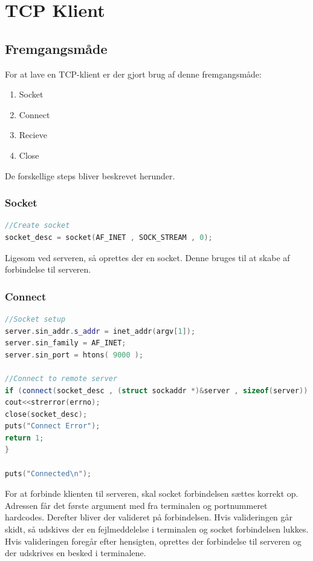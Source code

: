 \documentclass[12pt,fleqn,a4paper]{report}
\begin{document}
\chapter{TCP Klient}

\section{Fremgangsmåde}
For at lave en TCP-klient er der gjort brug af denne fremgangsmåde:
\begin{enumerate}
	\item Socket
	\item Connect
	\item Recieve
	\item Close
\end{enumerate}
De forskellige steps bliver beskrevet herunder.

\subsection{Socket}
\begin{framed}
	\begin{lstlisting}[language=C++]
//Create socket
socket_desc = socket(AF_INET , SOCK_STREAM , 0);
	\end{lstlisting}
\end{framed}

Ligesom ved serveren, så oprettes der en socket. Denne bruges til at skabe af forbindelse til serveren. 

\subsection{Connect}
\begin{framed}
\begin{lstlisting}[language=C++]
//Socket setup
server.sin_addr.s_addr = inet_addr(argv[1]);
server.sin_family = AF_INET;
server.sin_port = htons( 9000 );
	
//Connect to remote server
if (connect(socket_desc , (struct sockaddr *)&server , sizeof(server)) < 0) {
cout<<strerror(errno);
close(socket_desc);
puts("Connect Error");
return 1;
}
	
puts("Connected\n");
\end{lstlisting}
\end{framed}

For at forbinde klienten til serveren, skal socket forbindelsen sættes korrekt op. Adressen får det første argument med fra terminalen og portnummeret hardcodes. 
Derefter bliver der valideret på forbindelsen. Hvis valideringen går skidt, så udskives der en fejlmeddelelse i terminalen og socket forbindelsen lukkes.
Hvis valideringen foregår efter hensigten, oprettes der forbindelse til serveren og der udskrives en besked i terminalene.
\end{document}

